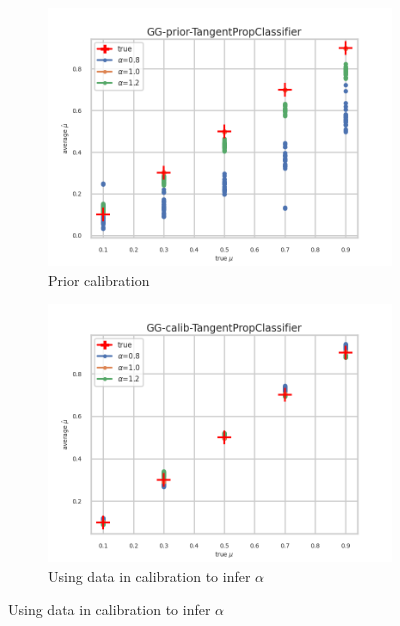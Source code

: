 \begin{figure}[ht!]
  \begin{subfigure}[t]{0.49\linewidth}
    \includegraphics[width=\linewidth]{COMPARE/GG-prior/TangentPropClassifier/profusion_true_mu_target_mean.png}
    \caption{Prior calibration}
  \end{subfigure}%
  \hfill
  \begin{subfigure}[t]{0.49\linewidth}
    \includegraphics[width=\linewidth]{COMPARE/GG-calib/TangentPropClassifier/profusion_true_mu_target_mean.png}
    \caption{Using data in calibration to infer $\alpha$}
  \end{subfigure}


\end{figure}

